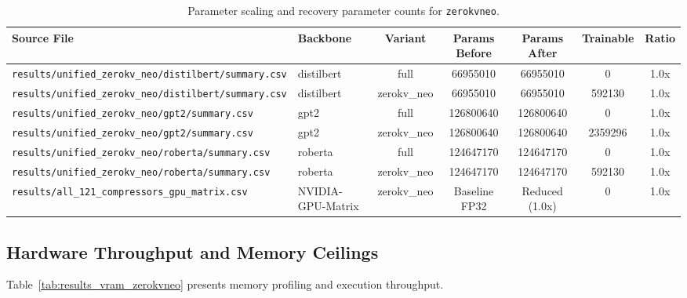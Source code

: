 \begin{table}[t]
\centering
\small
\begin{tabular}{llccccc}
\toprule
\textbf{Source File} & \textbf{Backbone} & \textbf{Variant} & \textbf{Params Before} & \textbf{Params After} & \textbf{Trainable} & \textbf{Ratio} \\
\midrule
\texttt{results/unified\_zerokv\_neo/distilbert/summary.csv} & distilbert & full & 66955010 & 66955010 & 0 & 1.0x \\
\texttt{results/unified\_zerokv\_neo/distilbert/summary.csv} & distilbert & zerokv\_neo & 66955010 & 66955010 & 592130 & 1.0x \\
\texttt{results/unified\_zerokv\_neo/gpt2/summary.csv} & gpt2 & full & 126800640 & 126800640 & 0 & 1.0x \\
\texttt{results/unified\_zerokv\_neo/gpt2/summary.csv} & gpt2 & zerokv\_neo & 126800640 & 126800640 & 2359296 & 1.0x \\
\texttt{results/unified\_zerokv\_neo/roberta/summary.csv} & roberta & full & 124647170 & 124647170 & 0 & 1.0x \\
\texttt{results/unified\_zerokv\_neo/roberta/summary.csv} & roberta & zerokv\_neo & 124647170 & 124647170 & 592130 & 1.0x \\
\texttt{results/all\_121\_compressors\_gpu\_matrix.csv} & NVIDIA-GPU-Matrix & zerokv\_neo & Baseline FP32 & Reduced (1.0x) & 0 & 1.0x \\
\bottomrule
\end{tabular}
\caption{Parameter scaling and recovery parameter counts for \texttt{zerokvneo}.}
\label{tab:results_params_zerokvneo}
\end{table}

\subsection{Hardware Throughput and Memory Ceilings}
Table~\ref{tab:results_vram_zerokvneo} presents memory profiling and execution throughput.

